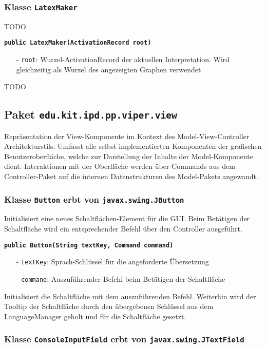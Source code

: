 \documentclass[parskip=full,11pt,twoside]{scrartcl}
\begin{document}
\subsubsection{Klasse \texttt{LatexMaker}}
TODO

\textbf{\texttt{public LatexMaker(ActivationRecord root)}}
\begin{itemize}[noitemsep]
	\item[-] \texttt{root}: Wurzel-ActivationRecord der aktuellen Interpretation. Wird gleichzeitig als Wurzel des angezeigten Graphen verwendet
\end{itemize}
TODO

\subsection{Paket \texttt{edu.kit.ipd.pp.viper.view}}

Repräsentation der View-Komponente im Kontext des Model-View-Controller Architekturstils. Umfasst alle selbst implementierten Komponenten der grafischen Benutzeroberfläche, welche zur Darstellung der Inhalte der Model-Komponente dient. Interaktionen mit der Oberfläche werden über Commands aus dem Controller-Paket auf die internen Datenstrukturen des Model-Pakets angewandt.

\subsubsection{Klasse \texttt{Button} erbt von \texttt{javax.swing.JButton}}

Initialisiert eine neues Schaltflächen-Element für die GUI. Beim Betätigen der Schaltfläche wird ein entsprechender Befehl über den Controller ausgeführt.

\textbf{\texttt{public Button(String textKey, Command command)}}
\begin{itemize}[noitemsep]
	\item[-] \texttt{textKey}: Sprach-Schlüssel für die angeforderte Übersetzung
	\item[-] \texttt{command}: Auszuführender Befehl beim Betätigen der Schaltfläche
\end{itemize}
Initialisiert die Schaltfläche mit dem auszuführenden Befehl. Weiterhin wird der Tooltip der Schaltfläche durch den übergebenen Schlüssel aus dem LanguageManager geholt und für die Schaltfläche gesetzt.

\subsubsection{Klasse \texttt{ConsoleInputField} erbt von \texttt{javax.swing.JTextField}}
\end{document}

